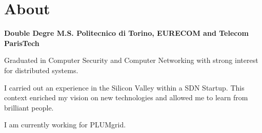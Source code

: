 \documentclass[]{cv}
\begin{document}


\footer{\today}





\section{About}

\parbox[t]{\textwidth}{\textbf{Double Degre M.S. Politecnico di
    Torino, EURECOM and Telecom ParisTech}}

Graduated in Computer Security and Computer Networking with strong
interest for distributed systems.

I carried out an experience in the Silicon Valley within a SDN
Startup. This context enriched my vision on new technologies and
allowed me to learn from brilliant people.

I am currently working for PLUMgrid.

\framebreak
\end{document}
